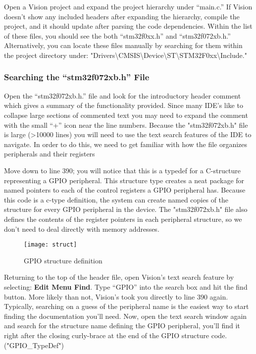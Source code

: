 \documentclass[11pt,fleqn]{book} %
\begin{document}
Open a {\textmu}Vision project and expand the project hierarchy under ``main.c.'' If {\textmu}Vision doesn't show any included headers after expanding the hierarchy, compile the project, and it should update after parsing the code dependencies. Within the list of these files, you should see the both ``stm32f0xx.h'' and ``stm32f072xb.h.''  Alternatively, you can locate these files manually by searching for them within the project directory under: "Drivers\textbackslash CMSIS\textbackslash Device\textbackslash ST\textbackslash STM32F0xx\textbackslash Include." 

\subsubsection{Searching the ``stm32f072xb.h'' File}

Open the ``stm32f072xb.h.'' file and look for the introductory header comment which gives a summary of the functionality provided. Since many IDE's like to collapse large sections of commented text you may need to expand the comment with the small ``+'' icon near the line numbers. Because the "stm32f072xb.h" file is large (>10000 lines) you will need to use the text search features of the IDE to navigate. In order to do this, we need to get familiar with how the file organizes peripherals and their registers

Move down to line 390; you will notice that this is a typedef for a C-structure representing a GPIO peripheral. This structure type creates a neat package for named pointers to each of the control registers a GPIO peripheral has. Because this code is a c-type definition, the system can create named copies of the structure for every GPIO peripheral in the device. The "stm32f072xb.h" file also defines the contents of the register pointers in each peripheral structure, so we don't need to deal directly with memory addresses.

\begin{figure}[]
    \centering\texttt{[image: struct]}
    \caption{GPIO structure definition}
    \label{struct}
\end{figure}

Returning to the top of the header file, open {\textmu}Vision's text search feature by selecting: \textbf{Edit Menu \textrightarrow Find}. Type ``GPIO'' into the search box and hit the find button. More likely than not, {\textmu}Vision's took you directly to line 390 again. Typically, searching on a guess of the peripheral name is the easiest way to start finding the documentation you'll need. Now, open the text search window again and search for the structure name defining the GPIO peripheral, you'll find it right after the closing curly-brace at the end of the GPIO structure code. ("GPIO\_TypeDef")
\end{document}
